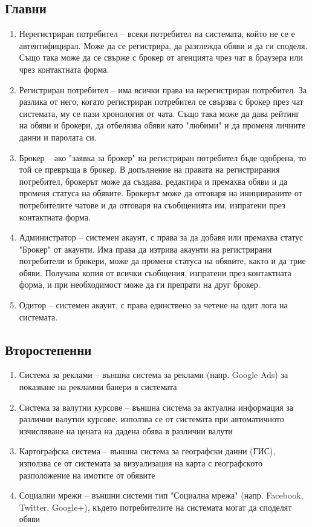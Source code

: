 \documentclass[a4paper]{article}
\begin{document}
\subsection{Главни}
\begin{enumerate}
\item {Нерегистриран потребител -- всеки потребител на системата, който не се е автентифицирал. Може да се регистрира, да разглежда обяви и да ги споделя. Също така може да се свърже с брокер от агенцията чрез чат в браузера или чрез контактната форма.
}
\item {Регистриран потребител -- има всички права на нерегистриран потребител. За разлика от него, когато регистриран потребител се свързва с брокер през чат системата, му се пази хронология от чата. Също така може да дава рейтинг на обяви и брокери, да отбелязва обяви като "любими" и да променя личните данни и паролата си.
}
\item {Брокер -- ако "заявка за брокер" на регистриран потребител бъде одобрена, то той се превръща в брокер. В допълнение на правата на регистрирания потребител, брокерът може да създава, редактира и премахва обяви и да променя статуса на обявите. Брокерът може да отговаря на инициираните от потребителите чатове и да отговаря на съобщенията им, изпратени през контактната форма.
}
\item {Администратор -- системен акаунт, с права за да добавя или премахва статус "Брокер" от акаунти. Има права да изтрива акаунти на регистрирани потребители и брокери, може да променя статуса на обявите, както и да трие обяви. Получава копия от всички съобщения, изпратени през контактната форма, и при необходимост може да ги препрати на друг брокер.
}
\item {Одитор -- системен акаунт, с права единствено за четене на одит лога на системата.
}
\end{enumerate}

\subsection{Второстепенни}
\begin{enumerate}
\item {Система за реклами -- външна система за реклами (напр. Google Ads) за показване на рекламни банери в системата
}
\item {Система за валутни курсове -- външна система за актуална информация за различни валутни курсове, използва се от системата при автоматичното изчисляване на цената на дадена обява в различни валути
}
\item {Картографска система -- външна система за географски данни (ГИС), използва се от системата за визуализация на карта с географското разположение на имотите от обявите
}
\item {Социални мрежи -- външни системи тип "Социална мрежа" (напр. Facebook, Twitter, Google+), където потребителите на системата могат да споделят обяви
}
\end{enumerate}
\end{document}

